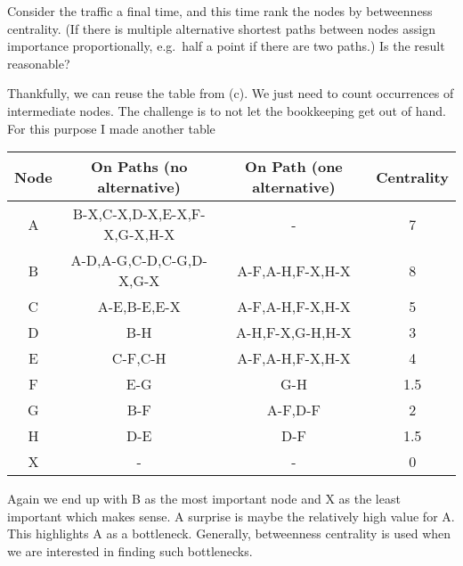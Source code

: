 Consider the traffic a final time, and this time rank the nodes by betweenness centrality. (If there is multiple alternative shortest paths between nodes assign importance proportionally, e.g.~half a point if there are two paths.)  Is the result reasonable?

\solution
Thankfully, we can reuse the table from (c). We just need to count occurrences of intermediate nodes. The challenge is to not let the bookkeeping get out of hand. For this purpose I made another table

\begin{center}
\begin{tabular}{c c c c}
Node & On Paths (no alternative) & On Path (one alternative) & Centrality \\\hline
A & B-X,C-X,D-X,E-X,F-X,G-X,H-X & - & 7 \\
B & A-D,A-G,C-D,C-G,D-X,G-X & A-F,A-H,F-X,H-X & 8 \\
C & A-E,B-E,E-X & A-F,A-H,F-X,H-X & 5 \\
D & B-H & A-H,F-X,G-H,H-X & 3 \\
E & C-F,C-H & A-F,A-H,F-X,H-X & 4 \\
F & E-G & G-H & 1.5 \\
G & B-F & A-F,D-F & 2   \\
H & D-E & D-F & 1.5 \\
X & - & - & 0 \\  
\end{tabular}
\end{center}
Again we end up with B as the most important node and X as the least important which makes sense. A surprise is maybe the relatively high value for A. This highlights A as a bottleneck. Generally, betweenness centrality is used when we are interested in finding such bottlenecks. 